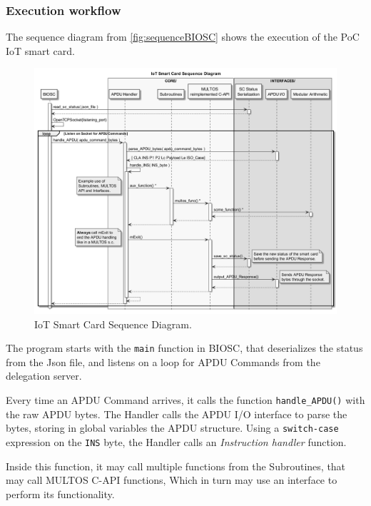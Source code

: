 \subsubsection{Execution workflow}

The sequence diagram from \autoref{fig:sequenceBIOSC} shows the execution of the PoC IoT smart card.



\begin{figure}[bth]
	\begin{center}
		\includegraphics[width=\linewidth]{gfx/UML/sequenceBIOSC}
	\end{center}
	\caption{IoT Smart Card Sequence Diagram.}
	\label{fig:sequenceBIOSC}
\end{figure}



The program starts with the \texttt{main} function in BIOSC, that deserializes the status from the Json file, and listens on a loop for APDU Commands from the delegation server.

Every time an APDU Command arrives, it calls the function \texttt{handle\_APDU()} with the raw APDU bytes. The Handler calls the APDU I/O interface to parse the bytes, storing in global variables the APDU structure. Using a \texttt{switch-case} expression on the \texttt{INS} byte, the Handler calls an \textit{Instruction handler} function.

Inside this function, it may call multiple functions from the Subroutines, that may call MULTOS C-API functions, Which in turn may use an interface to perform its functionality.


